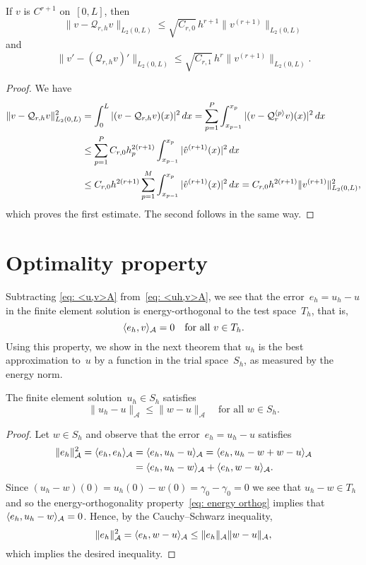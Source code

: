 \begin{theorem}\label{thm: Q r h}
If $v$ is $C^{r+1}$ on~$[0,L]$, then
\[
\|v-\mathcal{Q}_{r,h}v\|_{L_2(0,L)}
    \le\sqrt{C_{r,0}}\,h^{r+1}\|v^{(r+1)}\|_{L_2(0,L)}
\]
and
\[
\|v'-(\mathcal{Q}_{r,h}v)'\|_{L_2(0,L)}
    \le\sqrt{C_{r,1}}\,h^r\|v^{(r+1)}\|_{L_2(0,L)}.
\]
\end{theorem}
\begin{proof}
We have
\begin{align*}
\|v-\mathcal{Q}_{r,h}v\|_{L_2(0,L)}^2
    &=\int_0^L|(v-\mathcal{Q}_{r,h}v)(x)|^2\,dx=\sum_{p=1}^P
    \int_{x_{p-1}}^{x_p}|(v-\mathcal{Q}_r^{\langle p\rangle}v)(x)|^2\,dx\\
    &\le\sum_{p=1}^P C_{r,0}h_p^{2(r+1)}\int_{x_{p-1}}^{x_p}
        |\hat v^{(r+1)}(x)|^2\,dx\\
    &\le C_{r,0}h^{2(r+1)}\sum_{p=1}^M\int_{x_{p-1}}^{x_p} 
        |\hat v^{(r+1)}(x)|^2\,dx
    =C_{r,0}h^{2(r+1)}\|v^{(r+1)}\|_{L_2(0,L)}^2,
\end{align*}
which proves the first estimate.  The second follows in the same way.
\end{proof}

\section{Optimality property}
Subtracting \eqref{eq: <u,v>A} from~\eqref{eq: <uh,v>A}, we see that the
error~$e_h=u_h-u$ in the finite element solution is energy-orthogonal to the 
test space~$T_h$, that is, 
\begin{equation}\label{eq: energy orthog}
\langle e_h,v\rangle_{\mathcal{A}}=0\quad\text{for all $v\in T_h$.}
\end{equation}
Using this property, we show in the next theorem that $u_h$ is the best 
approximation to~$u$ by a function in the trial space~$S_h$, as measured by 
the energy norm.

\begin{theorem}\label{thm: optimality}
The finite element solution~$u_h\in S_h$ satisfies
\[
\|u_h-u\|_{\mathcal{A}}\le\|w-u\|_{\mathcal{A}}
	\quad\text{for all $w\in S_h$.}
\]
\end{theorem}
\begin{proof}
Let $w\in S_h$ and observe that the error~$e_h=u_h-u$ satisfies
\begin{align*}
\|e_h\|_{\mathcal{A}}^2=\langle e_h,e_h\rangle_{\mathcal{A}}
	&=\langle e_h,u_h-u\rangle_{\mathcal{A}}
	=\langle e_h,u_h-w+w-u\rangle_{\mathcal{A}}\\
	&=\langle e_h,u_h-w\rangle_{\mathcal{A}}+\langle e_h,w-u\rangle_{\mathcal{A}}.
\end{align*}
Since $(u_h-w)(0)=u_h(0)-w(0)=\gamma_0-\gamma_0=0$ we see that $u_h-w\in T_h$
and so the energy-orthogonality property~\eqref{eq: energy orthog} implies
that $\langle e_h,u_h-w\rangle_{\mathcal{A}}=0$.  Hence, by the Cauchy--Schwarz
inequality,
\[
\|e_h\|_{\mathcal{A}}^2=\langle e_h,w-u\rangle_{\mathcal{A}}
	\le\|e_h\|_{\mathcal{A}}\|w-u\|_{\mathcal{A}},
\]
which implies the desired inequality.
\end{proof}

